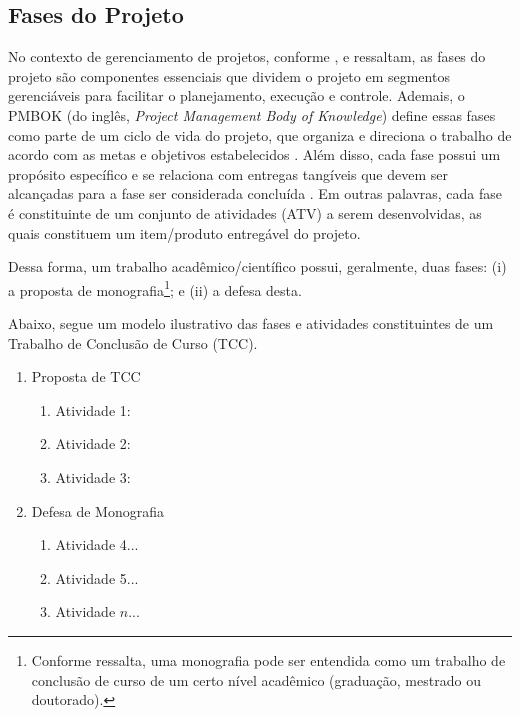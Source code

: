 \subsection{Fases do Projeto}\label{sec:fases_projeto}

No contexto de gerenciamento de projetos, conforme , e  ressaltam, as fases do projeto são componentes essenciais que dividem o projeto em segmentos gerenciáveis para facilitar o planejamento, execução e controle. Ademais, o PMBOK (do inglês, \textit{Project Management Body of Knowledge}) define essas fases como parte de um ciclo de vida do projeto, que organiza e direciona o trabalho de acordo com as metas e objetivos estabelecidos \cite{Anunciacao2020,Ramos2020}. Além disso, cada fase possui um propósito específico e se relaciona com entregas tangíveis que devem ser alcançadas para a fase ser considerada concluída \cite{PMBOK2021}. Em outras palavras, cada fase é constituinte de um conjunto de atividades (ATV) a serem desenvolvidas, as quais constituem um item/produto entregável do projeto.

Dessa forma, um trabalho acadêmico/científico possui, geralmente, duas fases: (i) a proposta de monografia\footnote{Conforme  ressalta, uma monografia pode ser entendida como um trabalho de conclusão de curso de um certo nível acadêmico (graduação, mestrado ou doutorado).}; e (ii) a defesa desta.

Abaixo, segue um modelo ilustrativo das fases e atividades constituintes de um Trabalho de Conclusão de Curso (TCC).
\begin{enumerate}[label=\textbf{Fase \arabic*:}, itemsep=0pt, leftmargin=3.5cm]
    \item Proposta de TCC
        \begin{enumerate}[resume, label=\textbf{ATV \arabic*)}, itemsep=0pt]
            \item Atividade 1: \lipsum[1]
            \item Atividade 2: \lipsum[2]
            \item Atividade 3: \lipsum[3]
        \end{enumerate}
    \item Defesa de Monografia
        \begin{enumerate}[resume, label=\textbf{ATV \arabic*)}, itemsep=0pt]
            \item Atividade 4...
            \item Atividade 5...
            \item Atividade $n$...
        \end{enumerate}
\end{enumerate}